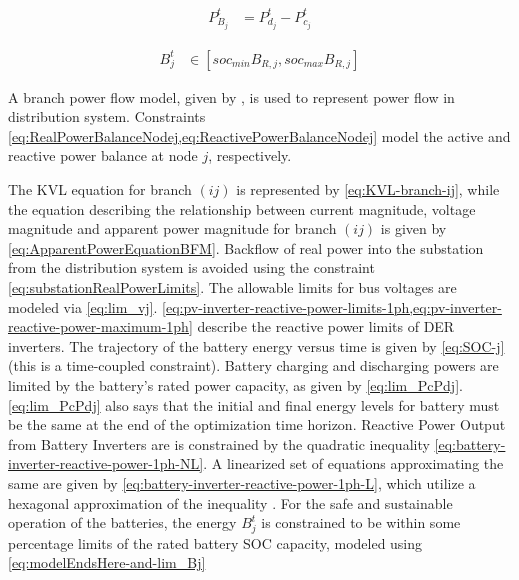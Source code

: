 \documentclass[../../outputs/main.tex]{subfiles}
\begin{document}
\vspace{-1.5em} %

\begin{align}
{ P_{B_j}^t } &= { P_{d_j}^t - P_{c_j}^t } \label{eq:battery-power-output-definition}
\end{align}
\vspace{-1.5em} %

\begin{align}
    { B^{t}_{j} } &\in { \left[ soc_{min}B_{R, j}, soc_{max}B_{R, j} \right] } \label{eq:modelEndsHere-and-lim_Bj}
\end{align}

A branch power flow model, given by , is used to represent power flow in distribution system.   Constraints \cref{eq:RealPowerBalanceNodej,eq:ReactivePowerBalanceNodej} model the active and reactive power balance at node $j$, respectively.

The KVL equation for branch $(ij)$ is represented by \cref{eq:KVL-branch-ij}, while the equation describing the relationship between current magnitude, voltage magnitude and apparent power magnitude for branch $(ij)$ is given by \cref{eq:ApparentPowerEquationBFM}. Backflow of real power into the substation from the distribution system is avoided using the constraint \cref{eq:substationRealPowerLimits}. The allowable limits for bus voltages are modeled via \cref{eq:lim_vj}. \cref{eq:pv-inverter-reactive-power-limits-1ph,eq:pv-inverter-reactive-power-maximum-1ph} describe the reactive power limits of DER inverters. The trajectory of the battery energy versus time is given by \cref{eq:SOC-j} (this is a time-coupled constraint). Battery charging and discharging powers are limited by the battery's rated power capacity, as given by \cref{eq:lim_PcPdj}. \cref{eq:lim_PcPdj} also says that the initial and final energy levels for battery must be the same at the end of the optimization time horizon. Reactive Power Output from Battery Inverters are is constrained by the quadratic inequality \cref{eq:battery-inverter-reactive-power-1ph-NL}. A linearized set of equations approximating the same are given by \cref{eq:battery-inverter-reactive-power-1ph-L},  which utilize a hexagonal approximation of the inequality \cite{Ahmadi2014Oct}. For the safe and sustainable operation of the batteries, the energy $B^{t}_{j}$ is constrained to be within some percentage limits of the rated battery SOC capacity, modeled using \cref{eq:modelEndsHere-and-lim_Bj}
\end{document}

